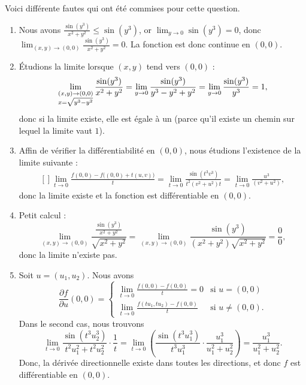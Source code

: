 Voici différente fautes qui ont été commises pour cette question.
\begin{enumerate}

\item
Nous avons $\frac{ \sin(y^3) }{ x^2+y^2 }\leq\sin(y^3)$, or $\lim_{y\to 0}\sin(y^3)=0$, donc $\lim_{(x,y)\to(0,0)}\frac{ \sin(y^3) }{ x^2+y^2 }=0 $. La fonction est donc continue en $(0,0)$.

\item
Étudions la limite lorsque $(x,y)$ tend vers $(0,0)$ :
\begin{equation}
	\begin{aligned}[]
		\lim_{ \begin{subarray}{l} (x,y)\to(0,0)\\x=\sqrt{y^3-y^2} \end{subarray} }\frac{ \sin(y^3) }{ x^2+y^2 }=\lim_{y\to 0} \frac{ \sin(y^3) }{ y^3-y^2+y^2 }=\lim_{y\to 0} \frac{ \sin(y^3) }{ y^3 }=1,
	\end{aligned}
\end{equation}
donc si la limite existe, elle est égale à un (parce qu'il existe un chemin sur lequel la limite vaut $1$).

\item
Affin de vérifier la différentiabilité en $(0,0)$, nous étudions l'existence de la limite suivante :
\begin{equation}
	\begin{aligned}[]
		\lim_{t\to 0} \frac{ f(0,0)-f\big( (0,0)+t(u,v) \big) }{ t }=\lim_{t\to 0} \frac{ \sin(t^3v^3) }{ t^2(v^2+u^2)t }=\lim_{t\to 0} \frac{ u^3 }{ (v^2+u^2) },
	\end{aligned}
\end{equation}
donc la limite existe et la fonction est différentiable en $(0,0)$.

\item
Petit calcul :
\begin{equation}
	\lim_{(x,y)\to (0,0)} \frac{ \frac{ \sin(y^3) }{ x^2+y^2 } }{ \sqrt{x^2+y^2} }=\lim_{(x,y)\to (0,0)} \frac{ \sin(y^3) }{ (x^2+y^2)\sqrt{x^2+y^2} }=\frac{ 0 }{ 0 },
\end{equation}
donc la limite n'existe pas.

\item
Soit $u=(u_1,u_2)$. Nous avons
\begin{equation}
	\frac{ \partial f }{ \partial u }(0,0)=
	\begin{cases}
	\lim_{t\to 0} \frac{ f(0,0)-f(0,0) }{ t }=0	&	\text{si $u=(0,0)$}\\
	\lim_{t\to 0} \frac{ f(tu_1,tu_2)-f(0,0) }{ t }	&	 \text{si $u\neq(0,0)$.}
\end{cases}
\end{equation}
Dans le second cas, nous trouvons
\begin{equation}
	\lim_{t\to 0} \frac{ \sin(t^3u_2^3) }{ t^2u_1^2+t^2u_2^2 }\cdot\frac{1}{ t }=\lim_{t\to 0} \left( \frac{ \sin(t^3u_1^3) }{ t^3u_1^3 }\cdot\frac{ u_1^3 }{ u_1^2+u_2^2 } \right)=\frac{ u_1^3 }{ u_1^2+u_2^2 }.
\end{equation}
Donc, la dérivée directionnelle existe dans toutes les directions, et donc $f$ est différentiable en $(0,0)$.


\end{enumerate}


